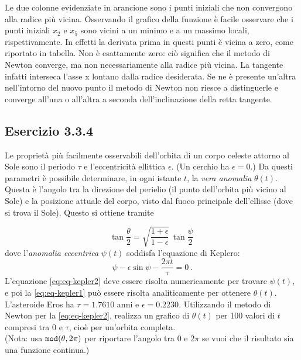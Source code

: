 \documentclass[letterpaper, 12pt]{article}
\numberwithin{equation}{section}    %
\begin{document}
Le due colonne evidenziate in arancione sono i punti iniziali che non convergono alla radice più vicina. 
Osservando il grafico della funzione è facile osservare che i punti iniziali $x_2$ e $x_5$ sono vicini a
un minimo e a un massimo locali, rispettivamente. In effetti la derivata prima in questi punti è vicina a zero,
come riportato in tabella. Non è esattamente zero: ciò significa che il metodo di Newton converge, ma
non necessariamente alla radice più vicina. La tangente infatti interseca l'asse x lontano dalla radice 
desiderata. Se ne è presente un'altra nell'intorno del nuovo punto il metodo di Newton non riesce
a distinguerle e converge all'una o all'altra a seconda dell'inclinazione della retta tangente.  \\

\subsection{Esercizio 3.3.4}
Le proprietà più facilmente osservabili dell'orbita di un corpo celeste attorno al Sole sono il periodo $\tau$ 
e l'eccentricità ellittica $\epsilon$. (Un cerchio ha $\epsilon=0$.) Da questi parametri è possibile determinare, 
in ogni istante $t$, la \textit{vera anomalia} $\theta(t)$. Questa è l'angolo tra la direzione del perielio 
(il punto dell'orbita più vicino al Sole) e la posizione attuale del corpo, visto dal fuoco principale 
dell'ellisse (dove si trova il Sole). Questo si ottiene tramite

\begin{equation}
    \label{eq:eq-kepler1}
    \tan \frac{\theta}{2} = \sqrt{\frac{1+\epsilon}{1-\epsilon}}\,
    \tan \frac{\psi}{2}\,
\end{equation}
dove l'\textit{anomalia eccentrica} $\psi(t)$ soddisfa l'equazione di Keplero:
\begin{equation}
    \label{eq:eq-kepler2}
    \psi - \epsilon \sin \psi - \frac{2\pi t}{\tau} = 0\,.
\end{equation}
L'equazione \ref{eq:eq-kepler2} deve essere risolta numericamente per trovare $\psi(t)$, 
e poi la \ref{eq:eq-kepler1} può essere risolta analiticamente per ottenere $\theta(t)$.
L'asteroide Eros ha $\tau=1.7610$ anni e $\epsilon=0.2230$. Utilizzando il metodo di Newton per la \ref{eq:eq-kepler2}, 
realizza un grafico di $\theta(t)$ per 100 valori di $t$ compresi tra $0$ e $\tau$, cioè per un'orbita completa.\\
(Nota: usa $\verb|mod|(\theta,2\pi)$ per riportare l'angolo tra 0 e $2\pi$ se vuoi che il risultato 
sia una funzione continua.)
\end{document}
